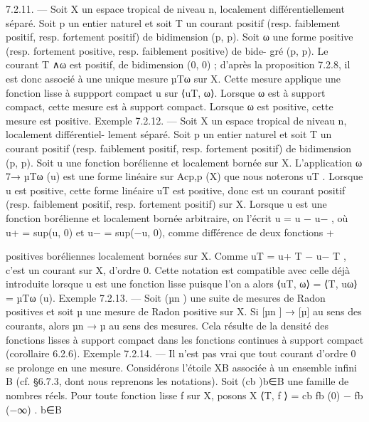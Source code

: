 \documentclass[
  10pt,
]{article}
\newenvironment{Shaded}{}{}
\newcommand{\NormalTok}[1]{#1}
\begin{document}
\begin{Shaded}
\begin{Highlighting}[]
\NormalTok{7.2.11. — Soit X un espace tropical de niveau n, localement différentiellement séparé.}
\NormalTok{Soit p un entier naturel et soit T un courant positif (resp. faiblement positif, resp.}
\NormalTok{fortement positif) de bidimension (p, p).}
\NormalTok{   Soit ω une forme positive (resp. fortement positive, resp. faiblement positive) de bide{-}}
\NormalTok{gré (p, p). Le courant T ∧ω est positif, de bidimension (0, 0) ; d’après la proposition 7.2.8,}
\NormalTok{il est donc associé à une unique mesure µTω sur X. Cette mesure applique une fonction}
\NormalTok{lisse à suppport compact u sur ⟨uT, ω⟩. Lorsque ω est à support compact, cette mesure}
\NormalTok{est à support compact. Lorsque ω est positive, cette mesure est positive.}
\NormalTok{Exemple 7.2.12. — Soit X un espace tropical de niveau n, localement différentiel{-}}
\NormalTok{lement séparé. Soit p un entier naturel et soit T un courant positif (resp. faiblement}
\NormalTok{positif, resp. fortement positif) de bidimension (p, p). Soit u une fonction borélienne et}
\NormalTok{localement bornée sur X. L’application ω 7→ µTω (u) est une forme linéaire sur Acp,p (X)}
\NormalTok{que nous noterons uT .}
\NormalTok{   Lorsque u est positive, cette forme linéaire uT est positive, donc est un courant positif}
\NormalTok{(resp. faiblement positif, resp. fortement positif) sur X.}
\NormalTok{   Lorsque u est une fonction borélienne et localement bornée arbitraire, on l’écrit u =}
\NormalTok{u − u− , où u+ = sup(u, 0) et u− = sup(−u, 0), comme différence de deux fonctions}
\NormalTok{  +}

\NormalTok{positives boréliennes localement bornées sur X. Comme uT = u+ T − u− T , c’est un}
\NormalTok{courant sur X, d’ordre 0.}
\NormalTok{   Cette notation est compatible avec celle déjà introduite lorsque u est une fonction}
\NormalTok{lisse puisque l’on a alors ⟨uT, ω⟩ = ⟨T, uω⟩ = µTω (u).}
\NormalTok{Exemple 7.2.13. — Soit (µn ) une suite de mesures de Radon positives et soit µ une}
\NormalTok{mesure de Radon positive sur X. Si [µn ] → [µ] au sens des courants, alors µn → µ au}
\NormalTok{sens des mesures. Cela résulte de la densité des fonctions lisses à support compact dans}
\NormalTok{les fonctions continues à support compact (corollaire 6.2.6).}
\NormalTok{Exemple 7.2.14. — Il n’est pas vrai que tout courant d’ordre 0 se prolonge en une}
\NormalTok{mesure. Considérons l’étoile XB associée à un ensemble infini B (cf. §6.7.3, dont nous}
\NormalTok{reprenons les notations). Soit (cb )b∈B une famille de nombres réels. Pour toute fonction}
\NormalTok{lisse f sur X, posons}
\NormalTok{                                      X                      }
\NormalTok{                            ⟨T, f ⟩ =     cb fb (0) − fb (−∞) .}
\NormalTok{                                        b∈B}


\end{Highlighting}
\end{Shaded}
\end{document}
